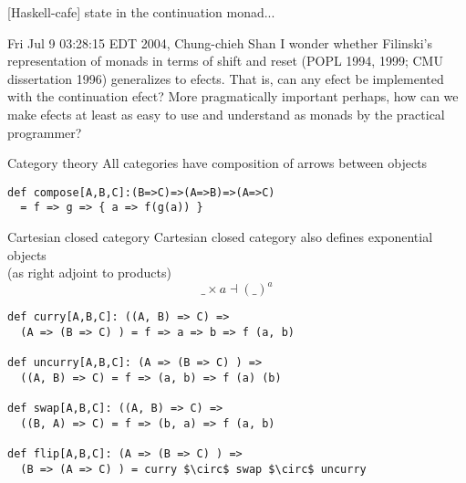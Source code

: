 \documentclass{beamer}
\begin{document}
    \begin{frame}[fragile]{[Haskell-cafe] state in the continuation monad...}
        \begin{block}{Fri Jul 9 03:28:15 EDT 2004, Chung-chieh Shan}
            I wonder whether Filinski's representation of monads in terms of shift
            and reset (POPL 1994, 1999; CMU dissertation 1996) generalizes to
            efects. That is, can any efect be implemented with the continuation
            efect? More pragmatically important perhaps, how can we make efects at
            least as easy to use and understand as monads by the practical
            programmer?
        \end{block}
    \end{frame}

    \begin{frame}[fragile]{Category theory}
        All categories have composition of arrows between objects
        \begin{center}
        \end{center}
        \begin{lstlisting}
def compose[A,B,C]:(B=>C)=>(A=>B)=>(A=>C)
  = f => g => { a => f(g(a)) }
        \end{lstlisting}
    \end{frame}

    \begin{frame}[fragile]{Cartesian closed category}
        Cartesian closed category also defines exponential objects \\
        (as right adjoint to products) \[\_ \times a \dashv (\_)^a\]
        \begin{center}
            \begin{lstlisting}
def curry[A,B,C]: ((A, B) => C) =>
  (A => (B => C) ) = f => a => b => f (a, b)

def uncurry[A,B,C]: (A => (B => C) ) =>
  ((A, B) => C) = f => (a, b) => f (a) (b)

def swap[A,B,C]: ((A, B) => C) =>
  ((B, A) => C) = f => (b, a) => f (a, b)

def flip[A,B,C]: (A => (B => C) ) =>
  (B => (A => C) ) = curry $\circ$ swap $\circ$ uncurry
            \end{lstlisting}
        \end{center}
    \end{frame}
\end{document}
